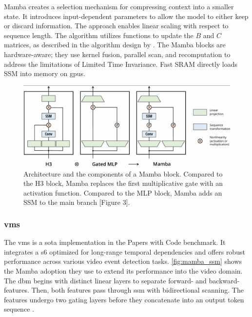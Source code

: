 Mamba\cite{gu_mamba_2024} creates a selection mechanism for compressing context into a smaller state. It introduces input-dependent parameters to allow the model to either keep or discard information. The approach enables linear scaling with respect to sequence length. The algorithm utilizes functions to update the \(B\) and \(C\) matrices, as described in the algorithm design by \textcite{gu_mamba_2024}. The Mamba blocks are hardware-aware; they use kernel fusion, parallel scan, and recomputation to address the limitations of Limited Time Invariance. Fast SRAM directly loads SSM into memory on \acrshort{gpu}s. 

\begin{figure}
    \centering
    \includegraphics[width=\linewidth]{figures/h3_mlp_mamba.png}
    \caption{Architecture and the components of a Mamba block. Compared to the H3 block, Mamba replaces the first multiplicative gate with an activation function. Compared to the MLP block, Mamba adds an SSM to the main branch \cite{gu_mamba_2024}[Figure 3].} 
    \label{fig:h3_mlp_mamba}
\end{figure}



\subsubsection{\acrfull{vms}}
The \acrfull{vms} is a \acrfull{sota} implementation in the Papers with Code benchmark. It integrates a \acrlong{s6} optimized for long-range temporal dependencies and offers robust performance across various video event detection tasks. \cref{fig:mamba_ssm} shows the Mamba adoption they use to extend its performance into the video domain. The \acrfull{dbm} begins with distinct linear layers to separate forward- and backward-features. Then, both features pass through \acrshort{ssm} with bidirectional scanning. The features undergo two gating layers before they concatenate into an output token sequence \cite{li_videomamba_2024}. 

